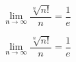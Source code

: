 \documentclass[12pt]{report}
\author{yuanxijie@gmail.com}
\begin{document}
\fontsize{40.0pt}{\baselineskip}\selectfont
$$
\lim_{n\to\infty}{\frac{\sqrt[n]{n!}}{n}} = \frac{1}{e}
$$



\newpage
{}
\begin{small}
    $$
    \lim_{n\to\infty}{\frac{\sqrt[n]{n!}}{n}} = \frac{1}{e}
    $$
    \end{small}
    
\end{document}
